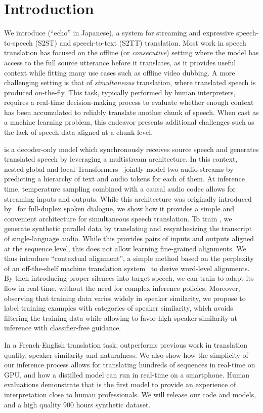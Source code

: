 \section{Introduction}
\label{introduction}

We introduce \ours{} (``echo'' in Japanese), a system for streaming and expressive speech-to-speech (S2ST) and speech-to-text (S2TT) translation. 
Most work in speech translation has focused on the offline (or \textit{consecutive}) setting where the model has access to the full source utterance before it translates, as it provides useful context while fitting many use cases such as offline video dubbing. A more challenging setting is that of \textit{simultaneous} translation, where translated speech is produced on-the-fly. This task, typically performed by human interpreters, requires a real-time decision-making process to evaluate whether enough context has been accumulated to reliably translate another chunk of speech. When cast as a machine learning problem, this endeavor presents additional challenges such as the lack of speech data aligned at a chunk-level.

\ours is a decoder-only model which synchronously receives source speech and generates translated speech by leveraging a multistream architecture. In this context, nested global and local Transformers~\cite{attentionvaswani} jointly model two audio streams by predicting a hierarchy of text and audio tokens for each of them. At inference time, temperature sampling combined with a causal audio codec allows for streaming inputs and outputs. While this architecture was originally introduced by~\citet{moshi} for full-duplex spoken dialogue, we show how it provides a simple and convenient architecture for simultaneous speech translation. To train \ours, we generate synthetic parallel data by translating and resynthesizing the transcript of single-language audio. While this provides pairs of inputs and outputs aligned at the sequence level, this does not allow learning fine-grained alignments. We thus introduce ``contextual alignment'', a simple method based on the perplexity of an off-the-shelf machine translation system~\cite{madlad} to derive word-level alignments. By then introducing proper silences into target speech, we can train \ours to adapt its flow in real-time, without the need for complex inference policies. Moreover, observing that training data varies widely in speaker similarity, we propose to label training examples with categories of speaker similarity, which avoids filtering the training data while allowing to favor high speaker similarity at inference with classifier-free guidance.

In a French-English translation task, \ours outperforms previous work in translation quality, speaker similarity and naturalness. We also show how the simplicity of our inference process allows for translating hundreds of sequences in real-time on GPU, and how a distilled model can run in real-time on a smartphone. Human evaluations demonstrate that \ours is the first model to provide an experience of interpretation close to human professionals. We will release our code and models, and a high quality 900 hours synthetic dataset.